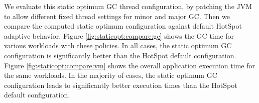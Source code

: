 We evaluate this static optimum GC thread configuration, by patching the JVM
to allow different fixed thread settings for minor and major GC.
Then we compare the computed static optimum configuration against default
HotSpot adaptive behavior.
Figure \ref{fig:staticopt:compare:gc} shows the GC time for various
workloads with these policies. In all cases, the static optimum GC configuration
is significantly better than the HotSpot default configuration.
Figure \ref{fig:staticopt:compare:vm} shows the overall application
execution time for the same workloads. 
In the majority of cases, the static optimum GC configuration leads to significantly better execution times than the HotSpot default configuration.